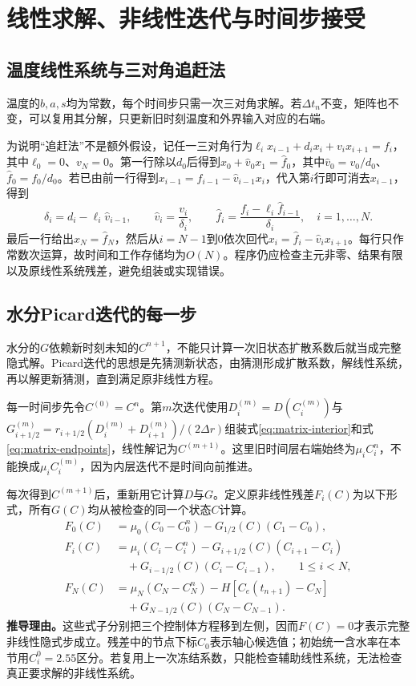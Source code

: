 \documentclass[UTF8,a4paper,zihao=-4,fontset=none]{ctexart}
\numberwithin{equation}{section}
\newcommand{\reason}[1]{\textbf{推导理由。}#1\par}
\begin{document}
\section{线性求解、非线性迭代与时间步接受}
\subsection{温度线性系统与三对角追赶法}
温度的$b,a,s$均为常数，每个时间步只需一次三对角求解。若$\Delta t_n$不变，矩阵也不变，可以复用其分解，只更新旧时刻温度和外界输入对应的右端。

为说明“追赶法”不是额外假设，记任一三对角行为$\ell_i x_{i-1}+d_i x_i+v_i x_{i+1}=f_i$，其中$\ell_0=0$、$v_N=0$。第一行除以$d_0$后得到$x_0+\widehat v_0x_1=\widehat f_0$，其中$\widehat v_0=v_0/d_0$、$\widehat f_0=f_0/d_0$。若已由前一行得到$x_{i-1}=\widehat f_{i-1}-\widehat v_{i-1}x_i$，代入第$i$行即可消去$x_{i-1}$，得到
\begin{equation}
\delta_i=d_i-\ell_i\widehat v_{i-1},\qquad
\widehat v_i=\frac{v_i}{\delta_i},\qquad
\widehat f_i=\frac{f_i-\ell_i\widehat f_{i-1}}{\delta_i},
\quad i=1,\ldots,N.
\label{eq:thomas}
\end{equation}
最后一行给出$x_N=\widehat f_N$，然后从$i=N-1$到0依次回代$x_i=\widehat f_i-\widehat v_i x_{i+1}$。每行只作常数次运算，故时间和工作存储均为$O(N)$。程序仍应检查主元非零、结果有限以及原线性系统残差，避免组装或实现错误。

\subsection{水分Picard迭代的每一步}
水分的$G$依赖新时刻未知的$C^{n+1}$，不能只计算一次旧状态扩散系数后就当成完整隐式解。Picard迭代的思想是先猜测新状态，由猜测形成扩散系数，解线性系统，再以解更新猜测，直到满足原非线性方程。

每一时间步先令$C^{(0)}=C^n$。第$m$次迭代使用$D_i^{(m)}=D(C_i^{(m)})$与$G_{i+1/2}^{(m)}=r_{i+1/2}(D_i^{(m)}+D_{i+1}^{(m)})/(2\Delta r)$组装式\eqref{eq:matrix-interior}和式\eqref{eq:matrix-endpoints}，线性解记为$C^{(m+1)}$。这里旧时间层右端始终为$\mu_iC_i^n$，不能换成$\mu_iC_i^{(m)}$，因为内层迭代不是时间向前推进。

每次得到$C^{(m+1)}$后，重新用它计算$D$与$G$。定义原非线性残差$F_i(C)$为以下形式，所有$G(C)$均从被检查的同一个状态$C$计算。
\begin{equation}
\begin{aligned}
F_0(C)&=\mu_0(C_0-C_0^n)-G_{1/2}(C)(C_1-C_0),\\
F_i(C)&=\mu_i(C_i-C_i^n)
-G_{i+1/2}(C)(C_{i+1}-C_i)\\
&\quad+G_{i-1/2}(C)(C_i-C_{i-1}),\qquad 1\le i<N,\\
F_N(C)&=\mu_N(C_N-C_N^n)
-H[C_e(t_{n+1})-C_N]\\
&\quad+G_{N-1/2}(C)(C_N-C_{N-1}).
\end{aligned}
\label{eq:nonlinear-residual}
\end{equation}
\reason{这些式子分别把三个控制体方程移到左侧，因而$F(C)=0$才表示完整非线性隐式步成立。残差中的节点下标$C_0$表示轴心候选值；初始统一含水率在本节用$C_i^0=2.55$区分。若复用上一次冻结系数，只能检查辅助线性系统，无法检查真正要求解的非线性系统。}
\end{document}
